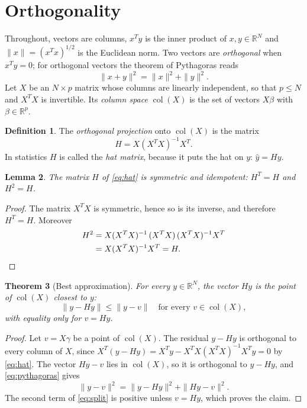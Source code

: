 \documentclass[11pt,oneside,openany]{book}
\newtheorem{theorem}{Theorem}[chapter]
\newtheorem{lemma}[theorem]{Lemma}
\theoremstyle{definition}
\newtheorem{definition}[theorem]{Definition}
\numberwithin{equation}{chapter}
\DeclareMathOperator{\col}{col}
\begin{document}
\section{Orthogonality}
Throughout, vectors are columns, $x^T y$ is the inner product of $x, y \in \mathbb{R}^N$ and
$\|x\| = (x^T x)^{1/2}$ is the Euclidean norm. Two vectors are \emph{orthogonal}
when $x^T y = 0$; for orthogonal vectors the theorem of Pythagoras reads
\begin{equation}\label{eq:pythagoras}
\|x + y\|^2 = \|x\|^2 + \|y\|^2 .
\end{equation}
Let $X$ be an $N \times p$ matrix whose columns are linearly independent, so that $p \le N$ and
$X^T X$ is invertible. Its \emph{column space} $\col(X)$ is the set of vectors $X\beta$ with
$\beta \in \mathbb{R}^p$.
\begin{definition}\label{def:proj}
The \emph{orthogonal projection} onto $\col(X)$ is the matrix
\begin{equation}\label{eq:hat}
H = X (X^T X)^{-1} X^T .
\end{equation}
In statistics $H$ is called the \emph{hat matrix}, because it puts the hat on $y$:
$\hat y = H y$.
\end{definition}
\begin{lemma}\label{lem:idem}
The matrix $H$ of \eqref{eq:hat} is symmetric and idempotent: $H^T = H$ and $H^2 = H$.
\end{lemma}
\begin{proof}
The matrix $X^T X$ is symmetric, hence so is its inverse, and therefore $H^T = H$. Moreover
\begin{align*}
H^2 &= X (X^T X)^{-1} \, (X^T X) \, (X^T X)^{-1} X^T \\
    &= X (X^T X)^{-1} X^T = H . \qedhere
\end{align*}
\end{proof}
\begin{theorem}[Best approximation]\label{thm:best}
For every $y \in \mathbb{R}^N$, the vector $H y$ is the point of $\col(X)$ closest to $y$:
\[
\|y - Hy\| \le \|y - v\| \quad \text{for every } v \in \col(X),
\]
with equality only for $v = Hy$.
\end{theorem}
\begin{proof}
Let $v = X\gamma$ be a point of $\col(X)$. The residual $y - Hy$ is orthogonal to every column of $X$,
since $X^T (y - Hy) = X^T y - X^T X (X^TX)^{-1} X^T y = 0$ by \eqref{eq:hat}. The vector $Hy - v$
lies in $\col(X)$, so it is orthogonal to $y - Hy$, and \eqref{eq:pythagoras} gives
\begin{equation}\label{eq:split}
\|y - v\|^2 = \|y - Hy\|^2 + \|Hy - v\|^2 .
\end{equation}
The second term of \eqref{eq:split} is positive unless $v = Hy$, which proves the claim.
\end{proof}
\end{document}
